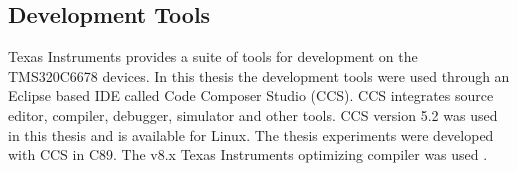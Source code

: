 \subsection{Development Tools}
\label{subsec:devtools}

Texas Instruments provides a suite of tools for development on the TMS320C6678 devices. In this thesis the development tools were used through an Eclipse based IDE called Code Composer Studio (CCS). CCS integrates source editor, compiler, debugger, simulator and other tools. CCS version 5.2 was used in this thesis and is available for Linux. \cite{ccspage} The thesis experiments were developed with CCS in C89. The v8.x Texas Instruments optimizing compiler was used \cite{compilerguide}.
